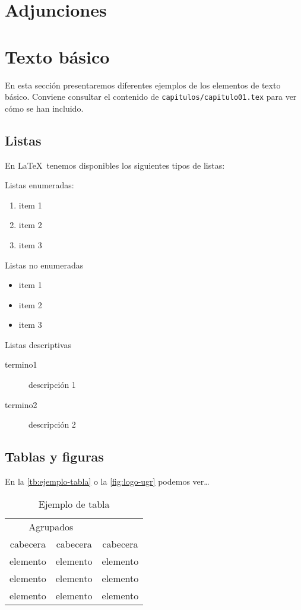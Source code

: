 \section{Adjunciones}

\section{Texto básico}

En esta sección presentaremos diferentes ejemplos de los elementos de texto básico. Conviene consultar el contenido de \texttt{capitulos/capitulo01.tex} para ver cómo se han incluido.

\subsection{Listas}
En \LaTeX\ tenemos disponibles los siguientes tipos de listas:

Listas enumeradas:
\begin{enumerate}
  \item item 1
  \item item 2
  \item item 3
\end{enumerate}

Listas no enumeradas
\begin{itemize}
  \item item 1
  \item item 2
  \item item 3
  \end{itemize}

Listas descriptivas
\begin{description}
  \item[termino1] descripción 1
  \item[termino2] descripción 2
\end{description}
  
\subsection{Tablas y figuras}

En la \autoref{tb:ejemplo-tabla} o la \autoref{fig:logo-ugr} podemos ver\ldots

\begin{table}[htpb]
  \centering
  \begin{tabular}{ccc} \toprule
    \multicolumn{2}{c}{Agrupados} \\ \cmidrule(r){1-2}
    cabecera & cabecera & cabecera          \\ \midrule
    elemento & elemento & elemento          \\ 
    elemento & elemento & elemento          \\ 
    elemento & elemento & elemento          \\ \bottomrule
  \end{tabular}
  \caption{Ejemplo de tabla}
  \label{tb:ejemplo-tabla}
\end{table}

